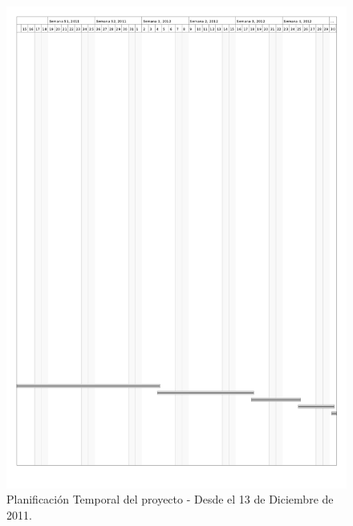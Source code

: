 \pagebreak
\begin{figure}[H]
\includegraphics[width=15.5cm]{planificacion_graphvisualx_6.png}
\caption{Planificación Temporal del proyecto - Desde el 13 de Diciembre de 2011.}
\end{figure}

